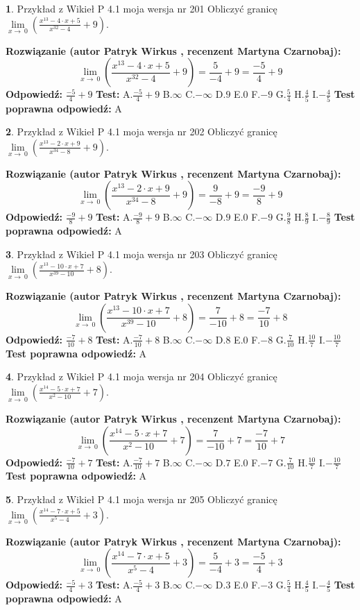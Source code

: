 \documentclass[12pt, a4paper]{article}
\theoremstyle{definition} %
\newtheorem{zad}{}
\newcommand{\zadStart}[1]{\begin{zad}#1\newline}
\newcommand{\zadStop}{\end{zad}}
\newcommand{\rozwStart}[2]{\noindent \textbf{Rozwiązanie (autor #1 , recenzent #2): }\newline}
\newcommand{\rozwStop}{\newline}
\newcommand{\odpStart}{\noindent \textbf{Odpowiedź:}\newline}
\newcommand{\odpStop}{\newline}
\newcommand{\testStart}{\noindent \textbf{Test:}\newline}
\newcommand{\testStop}{\newline}
\newcommand{\kluczStart}{\noindent \textbf{Test poprawna odpowiedź:}\newline}
\newcommand{\kluczStop}{\newline}
\begin{document}
\zadStart{Przykład z Wikieł P 4.1 moja wersja nr 201}
Obliczyć granicę $\lim\limits_{x\to\ 0}(\frac{x^{13}-4 \cdot x +5}{x^{32}-4}+9)$.
\zadStop
\rozwStart{Patryk Wirkus}{Martyna Czarnobaj}
$$\lim\limits_{x\to\ 0}(\frac{x^{13}-4 \cdot x +5}{x^{32}-4}+9)=\frac{5}{-4}+9=\frac{-5}{4}+9$$
\rozwStop
\odpStart
$\frac{-5}{4}+9$
\odpStop
\testStart
A.$\frac{-5}{4}+9$
B.$\infty$
C.$-\infty$
D.$9$
E.$0$
F.$-9$
G.$\frac{5}{4}$
H.$\frac{4}{5}$
I.$-\frac{4}{5}$
\testStop
\kluczStart
A
\kluczStop



\zadStart{Przykład z Wikieł P 4.1 moja wersja nr 202}
Obliczyć granicę $\lim\limits_{x\to\ 0}(\frac{x^{13}-2 \cdot x +9}{x^{34}-8}+9)$.
\zadStop
\rozwStart{Patryk Wirkus}{Martyna Czarnobaj}
$$\lim\limits_{x\to\ 0}(\frac{x^{13}-2 \cdot x +9}{x^{34}-8}+9)=\frac{9}{-8}+9=\frac{-9}{8}+9$$
\rozwStop
\odpStart
$\frac{-9}{8}+9$
\odpStop
\testStart
A.$\frac{-9}{8}+9$
B.$\infty$
C.$-\infty$
D.$9$
E.$0$
F.$-9$
G.$\frac{9}{8}$
H.$\frac{8}{9}$
I.$-\frac{8}{9}$
\testStop
\kluczStart
A
\kluczStop



\zadStart{Przykład z Wikieł P 4.1 moja wersja nr 203}
Obliczyć granicę $\lim\limits_{x\to\ 0}(\frac{x^{13}-10 \cdot x +7}{x^{39}-10}+8)$.
\zadStop
\rozwStart{Patryk Wirkus}{Martyna Czarnobaj}
$$\lim\limits_{x\to\ 0}(\frac{x^{13}-10 \cdot x +7}{x^{39}-10}+8)=\frac{7}{-10}+8=\frac{-7}{10}+8$$
\rozwStop
\odpStart
$\frac{-7}{10}+8$
\odpStop
\testStart
A.$\frac{-7}{10}+8$
B.$\infty$
C.$-\infty$
D.$8$
E.$0$
F.$-8$
G.$\frac{7}{10}$
H.$\frac{10}{7}$
I.$-\frac{10}{7}$
\testStop
\kluczStart
A
\kluczStop



\zadStart{Przykład z Wikieł P 4.1 moja wersja nr 204}
Obliczyć granicę $\lim\limits_{x\to\ 0}(\frac{x^{14}-5 \cdot x +7}{x^{2}-10}+7)$.
\zadStop
\rozwStart{Patryk Wirkus}{Martyna Czarnobaj}
$$\lim\limits_{x\to\ 0}(\frac{x^{14}-5 \cdot x +7}{x^{2}-10}+7)=\frac{7}{-10}+7=\frac{-7}{10}+7$$
\rozwStop
\odpStart
$\frac{-7}{10}+7$
\odpStop
\testStart
A.$\frac{-7}{10}+7$
B.$\infty$
C.$-\infty$
D.$7$
E.$0$
F.$-7$
G.$\frac{7}{10}$
H.$\frac{10}{7}$
I.$-\frac{10}{7}$
\testStop
\kluczStart
A
\kluczStop



\zadStart{Przykład z Wikieł P 4.1 moja wersja nr 205}
Obliczyć granicę $\lim\limits_{x\to\ 0}(\frac{x^{14}-7 \cdot x +5}{x^{5}-4}+3)$.
\zadStop
\rozwStart{Patryk Wirkus}{Martyna Czarnobaj}
$$\lim\limits_{x\to\ 0}(\frac{x^{14}-7 \cdot x +5}{x^{5}-4}+3)=\frac{5}{-4}+3=\frac{-5}{4}+3$$
\rozwStop
\odpStart
$\frac{-5}{4}+3$
\odpStop
\testStart
A.$\frac{-5}{4}+3$
B.$\infty$
C.$-\infty$
D.$3$
E.$0$
F.$-3$
G.$\frac{5}{4}$
H.$\frac{4}{5}$
I.$-\frac{4}{5}$
\testStop
\kluczStart
A
\kluczStop
\end{document}
